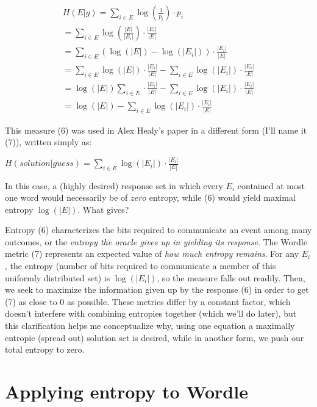 \documentclass[11pt, oneside]{article} 	%
\begin{document}
\begin{align}
H(E | g) = \sum_{i \in E} \log(\frac{1}{p_i}) \cdot p_i \\
= \sum_{i \in E} \log(\frac{|E|}{|E_i|}) \cdot \frac{|E_i|}{|E|} \\
= \sum_{i \in E} (\log(|E|) - \log(|E_i|)) \cdot \frac{|E_i|}{|E|} \\
= \sum_{i \in E} \log(|E|) \cdot \frac{|E_i|}{|E|} - \sum_{i \in E}\log(|E_i|) \cdot \frac{|E_i|}{|E|} \\
= \log(|E|) \sum_{i \in E} \cdot \frac{|E_i|}{|E|} - \sum_{i \in E}\log(|E_i|) \cdot \frac{|E_i|}{|E|} \\
= \log(|E|) - \sum_{i \in E}\log(|E_i|) \cdot \frac{|E_i|}{|E|}
\end{align}

This measure (6) was used in Alex Healy's paper \cite{1} in a different form (I'll name it (7)), written simply as:
\begin{center}
$H(solution | guess) = \sum_{i \in E}\log(|E_i|) \cdot \frac{|E_i|}{|E|}$ 
\end{center}

In this case, a (highly desired) response set in which every $E_i$ contained at most one word would necessarily be of $zero$ entropy, while (6) would yield maximal entropy $\log(|E|)$. What gives?

Entropy (6) characterizes the bits required to communicate an event among many outcomes, or the \emph{entropy the oracle gives up in yielding its response}. The Wordle metric (7) represents an expected value of \emph{how much entropy remains}. For any $E_i$, the entropy (number of bits required to communicate a member of this uniformly distributed set) is $\log(|E_i|)$, so the measure falls out readily. Then, we seek to maximize the information given up by the response (6) in order to get (7) as close to 0 as possible. These metrics differ by a constant factor, which doesn't interfere with combining entropies together (which we'll do later), but this clarification helps me conceptualize why, using one equation a maximally entropic (spread out) solution set is desired, while in another form, we push our total entropy to zero.

\section{Applying entropy to Wordle}
\end{document}
